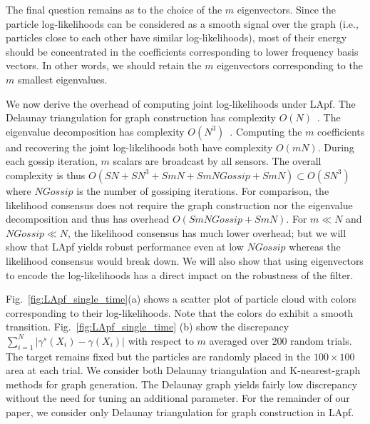\documentclass[10pt,letterpaper,final]{article}
\begin{document}
The final question remains as to the choice of the $m$ eigenvectors. Since the particle log-likelihoods can be considered as a smooth signal over the graph (i.e., particles close to each other have similar log-likelihoods), most of their energy should be concentrated in the coefficients corresponding to lower frequency basis vectors. In other words, we should retain the $m$ eigenvectors corresponding to the $m$ smallest eigenvalues. 

We now derive the overhead of computing joint log-likelihoods under LApf. The Delaunay triangulation for graph construction has complexity $O(N)$~\cite{Boissonnat1998}. The eigenvalue decomposition has complexity $O(N^3)$~\cite{Demmel2007}. Computing the $m$ coefficients and recovering the joint log-likelihoods both have complexity $O(mN)$. During each gossip iteration, $m$ scalars are broadcast by all sensors. The overall complexity is thus $O(SN+SN^3+SmN+SmNGossip+SmN)\subset O(SN^3)$ where $NGossip$ is the number of gossiping iterations. For comparison, the likelihood consensus does not require the graph construction nor the eigenvalue decomposition and thus has overhead $O(SmNGossip+SmN)$. For $m\ll N$ and $NGossip \ll N$, the likelihood consensus has much lower overhead; but we will show that LApf yields robust performance even at low $NGossip$ whereas the likelihood consensus would break down. We will also show that using eigenvectors to encode the log-likelihoods has a direct impact on the robustness of the filter. 

Fig.~\ref{fig:LApf_single_time}(a) shows a scatter plot of particle cloud with colors corresponding to their log-likelihoods. Note that the colors do exhibit a smooth transition. Fig.~\ref{fig:LApf_single_time} (b) show the discrepancy $\sum_{i=1}^N|\gamma^s(X_i)-\gamma(X_i)|$ with respect to $m$ averaged over 200 random trials. The target remains fixed but the particles are randomly placed in the $100\times 100$ area at each trial. We consider both Delaunay triangulation and K-nearest-graph methods for graph generation. The Delaunay graph yields fairly low discrepancy without the need for tuning an additional parameter. For the remainder of our paper, we consider only Delaunay triangulation for graph construction in LApf. 
\end{document}
